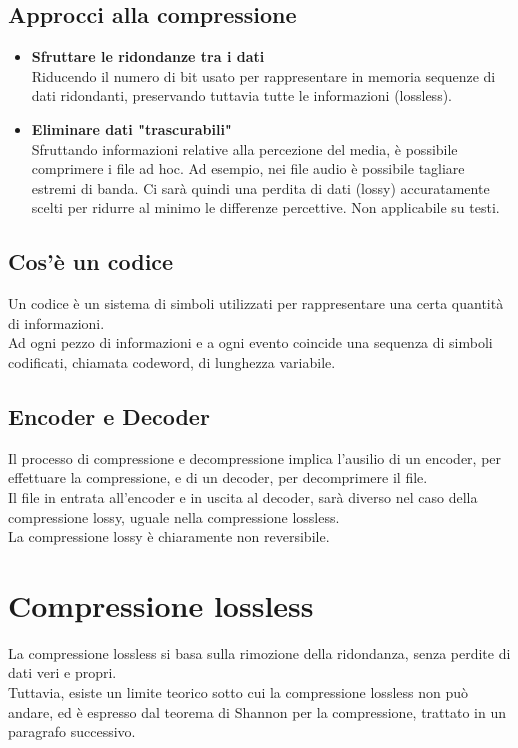 \documentclass{report}
\begin{document}
	\subsection{Approcci alla compressione}
	\begin{itemize}
		\item \textbf{Sfruttare le ridondanze tra i dati}\\
		      Riducendo il numero di bit usato per rappresentare in memoria sequenze di dati ridondanti, preservando tuttavia tutte le informazioni (lossless).
		\item \textbf{Eliminare dati "trascurabili"\\}
		      Sfruttando informazioni relative alla percezione del media, è possibile comprimere i file ad hoc. Ad esempio, nei file audio è possibile tagliare estremi di banda. Ci sarà quindi una perdita di dati (lossy) accuratamente scelti per ridurre al minimo le differenze percettive. Non applicabile su testi.
	\end{itemize}
		
	\subsection{Cos'è un codice}
	Un codice è un sistema di simboli utilizzati per rappresentare una certa quantità di informazioni.\\
	Ad ogni pezzo di informazioni e a ogni evento coincide una sequenza di simboli codificati, chiamata codeword, di lunghezza variabile.
		
	\subsection{Encoder e Decoder}
	Il processo di compressione e decompressione implica l'ausilio di un encoder, per effettuare la compressione, e di un decoder, per decomprimere il file.\\
	Il file in entrata all'encoder e in uscita al decoder, sarà diverso nel caso della compressione lossy, uguale nella compressione lossless.\\
	La compressione lossy è chiaramente non reversibile.
		
	\newpage
		
	\section{Compressione lossless}
	La compressione lossless si basa sulla rimozione della ridondanza, senza perdite di dati veri e propri.\\
	Tuttavia, esiste un limite teorico  sotto cui la compressione lossless non può andare, ed è espresso dal teorema di Shannon per la compressione, trattato in un paragrafo successivo.
\end{document}
